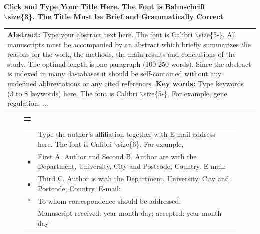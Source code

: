 \documentclass[10.5pt,compsoc]{ICN}
\theoremstyle{mystyle}
\newcommand{\lwbt}{\fontspec{bahnschrift.ttf}}%
\begin{document}
\begin{strip}

{\centering
{\textbf{\lwbt Click and Type Your Title Here. The Font is Bahnschrift \\[0mm]
$\backslash$size\{3\}. The Title Must be Brief and Grammatically Correct}}
\vskip 9mm}
{\vskip 5mm}


\centering
\begin{tabular}{p{160mm}}
{\setlength{\baselineskip}{18.5pt}\selectfont
\noindent
\textbf{Abstract:} {Type your abstract text here. The font is Calibri $\backslash$size\{5\--\}. All manuscripts must be accompanied by an abstract which briefly summarizes the reasons for the work, the methods, the main results and conclusions of the study. The optimal length is one paragraph (100-250 words). Since the abstract is indexed in many da-tabases it should be self-contained without any undefined abbreviations or any cited references.}
\vskip 4mm
\noindent
\textbf{ Key words:} {Type keywords (3 to 8 keywords) here. The font is Calibri $\backslash$size\{5\--\}. For example,  gene regulation; ...}\par}
\end{tabular}
\vskip 6mm
\vskip -3mm
\end{strip}
\thispagestyle{plain}%
\thispagestyle{empty}%
\makeatother
\pagestyle{tstheadings}
\begin{figure}[b]
\vskip -3mm
\begin{tabular}{p{44mm}}
\toprule\\
\end{tabular}
\vskip -5.5mm
\noindent
\setlength{\tabcolsep}{1pt}
\begin{tabular}{p{1.5mm}p{79.5mm}}
&Type the author's affiliation together with E-mail address here. The font is Calibri $\backslash$size\{6\}. For example,  \\
$\bullet$& First A. Author and Second B. Author are with the Department, University, City and Postcode, Country. E-mail:\\
$\bullet$& Third C. Author is with the Department, University, City and Postcode, Country. E-mail:
 \\
$*$&To whom correspondence should be addressed. \\
         &Manuscript received: year-month-day;
          accepted: year-month-day
\end{tabular}
\vspace {0mm}
\end{figure}
\vbox{}
\vskip 1mm
\noindent
\end{document}
